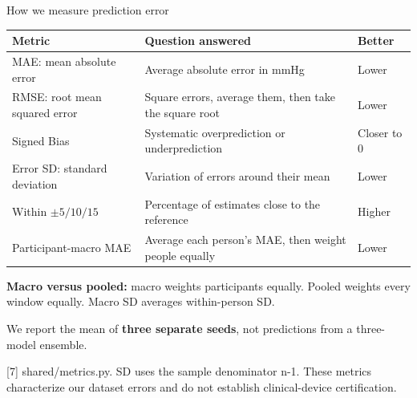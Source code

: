 \documentclass[aspectratio=169,11pt]{beamer}
\newcommand{\stagecontext}{Data and terminology}
\newcommand{\stage}[1]{\gdef\stagecontext{#1}}
\newcommand{\source}[1]{\vfill\par{\fontsize{7}{8}\selectfont\color{Muted}#1}}
\newcommand{\smalltable}{\fontsize{9}{11}\selectfont\renewcommand{\arraystretch}{1.18}}
\begin{document}
\stage{Results: metric definitions}
\begin{frame}{How we measure prediction error}
\smalltable\begin{tabular}{P{3.3cm}P{7.6cm}l}\toprule
Metric & Question answered & Better\\\midrule
MAE: mean absolute error & Average absolute error in mmHg & Lower\\
RMSE: root mean squared error & Square errors, average them, then take the square root & Lower\\
Signed Bias & Systematic overprediction or underprediction & Closer to 0\\
Error SD: standard deviation & Variation of errors around their mean & Lower\\
Within $\pm5/10/15$ & Percentage of estimates close to the reference & Higher\\
Participant-macro MAE & Average each person's MAE, then weight people equally & Lower\\\bottomrule\end{tabular}
\par\medskip\textbf{Macro versus pooled:} macro weights participants equally. Pooled weights every window equally. Macro SD averages within-person SD.
\par\medskip We report the mean of \textbf{three separate seeds}, not predictions from a three-model ensemble.
\source{[7] shared/metrics.py. SD uses the sample denominator n-1. These metrics characterize our dataset errors and do not establish clinical-device certification.}
\end{frame}
\end{document}
